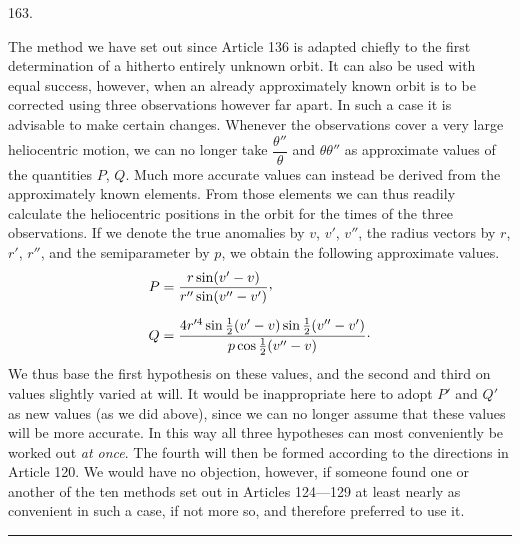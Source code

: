 \par{}\medskip
\begin{center}\hypertarget{native-226-article163}{}163.\end{center}
The method we have set out since Article 136 is adapted chiefly to the first determination of a hitherto entirely unknown orbit. It can also be used with equal success, however, when an already approximately known orbit is to be corrected using three observations however far apart. In such a case it is advisable to make certain changes. Whenever the observations cover a very large heliocentric motion, we can no longer take $\dfrac{\theta''}{\theta}$ and $\theta\theta''$ as approximate values of the quantities $P$, $Q$. Much more accurate values can instead be derived from the approximately known elements. From those elements we can thus readily calculate the heliocentric positions in the orbit for the times of the three observations. If we denote the true anomalies by $v$, $v'$, $v''$, the radius vectors by $r$, $r'$, $r''$, and the semiparameter by $p$, we obtain the following approximate values.
\[
\begin{aligned}
P&=\frac{r\sin(v'-v)}{r''\sin(v''-v')}\mathpunct{\raisebox{.45ex}{,}}\\[.6em]
Q&=\frac{4r'^4\sin\frac12(v'-v)\sin\frac12(v''-v')}{p\cos\frac12(v''-v)}\mathpunct{\cdot}
\end{aligned}
\]
\noindent We thus base the first hypothesis on these values, and the second and third on values slightly varied at will. It would be inappropriate here to adopt $P'$ and $Q'$ as new values (as we did above), since we can no longer assume that these values will be more accurate. In this way all three hypotheses can most conveniently be worked out \emph{at once}. The fourth will then be formed according to the directions in Article 120. We would have no objection, however, if someone found one or another of the ten methods set out in Articles 124---129 at least nearly as convenient in such a case, if not more so, and therefore preferred to use it.
\par\bigskip\begin{center}\rule{.23\linewidth}{.35pt}\end{center}
